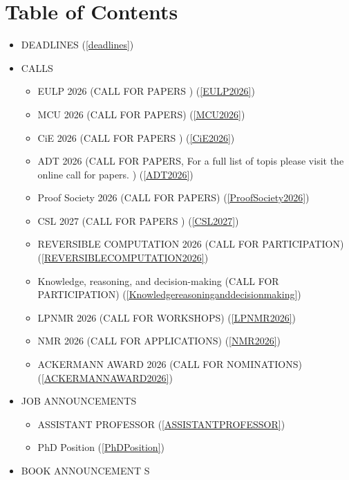 \documentclass[prodmode,acmtecs]{acmsmall} %
\begin{document}
\section{Table of Contents}\begin{itemize}\item DEADLINES (\cref{deadlines}) 
 
\item CALLS 
 
\begin{itemize}\item EULP 2026 (CALL FOR PAPERS ) (\cref{EULP2026})
\item MCU 2026 (CALL FOR PAPERS) (\cref{MCU2026})
\item CiE 2026 (CALL FOR PAPERS ) (\cref{CiE2026})
\item ADT 2026 (CALL FOR PAPERS, For a full list of topis please visit the online call for papers. ) (\cref{ADT2026})
\item Proof Society 2026 (CALL FOR PAPERS) (\cref{ProofSociety2026})
\item CSL 2027 (CALL FOR PAPERS ) (\cref{CSL2027})
\item REVERSIBLE COMPUTATION 2026 (CALL FOR PARTICIPATION) (\cref{REVERSIBLECOMPUTATION2026})
\item Knowledge, reasoning, and decision-making (CALL FOR PARTICIPATION) (\cref{Knowledgereasoninganddecisionmaking})
\item LPNMR 2026 (CALL FOR WORKSHOPS) (\cref{LPNMR2026})
\item NMR 2026 (CALL FOR APPLICATIONS) (\cref{NMR2026})
\item ACKERMANN AWARD 2026 (CALL FOR NOMINATIONS) (\cref{ACKERMANNAWARD2026})
\end{itemize} 
\item JOB ANNOUNCEMENTS 
 
\begin{itemize}\item ASSISTANT PROFESSOR (\cref{ASSISTANTPROFESSOR})
\item PhD Position (\cref{PhDPosition})
\end{itemize} 
\item BOOK ANNOUNCEMENT S 
 

\end{itemize}
\end{document}
